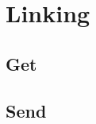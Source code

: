\section{Linking}

\subsection{Get}

\begin{frame}
\frametitle{}


\end{frame}



\subsection{Send}

\begin{frame}
\frametitle{}


\end{frame}

